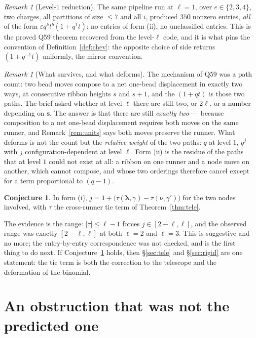 \documentclass[11pt]{article}
\theoremstyle{definition}
\newtheorem{conjecture}[theorem]{Conjecture}
\theoremstyle{remark}
\newtheorem{remark}[theorem]{Remark}
\newcommand{\bl}{\boldsymbol{\lambda}}
\newcommand{\bs}{\mathbf{s}}
\begin{document}
\begin{remark}[Level-$1$ reduction]\label{rem:l1}
The same pipeline run at $\ell=1$, over $e\in\{2,3,4\}$, two charges, all partitions of
size $\le7$ and all $i$, produced $350$ nonzero entries, \emph{all} of the form
$\varepsilon q^{k}t^{b}(1+q^{1}t)$: no entries of form (ii), no unclassified entries.
This is the proved Q59 theorem recovered from the level-$\ell$ code, and it is what
pins the convention of Definition~\ref{def:chev}: the opposite choice of side returns
$(1+q^{-1}t)$ uniformly, the mirror convention.
\end{remark}

\begin{remark}[What survives, and what deforms]
The mechanism of Q59 was a path count: two bead moves compose to a net one-bead
displacement in exactly two ways, at consecutive ribbon heights $s$ and $s+1$, and the
$(1+qt)$ is those two paths. The brief asked whether at level $\ell$ there are still
two, or $2\ell$, or a number depending on $\bs$. The answer is that there are still
\emph{exactly two} --- because composition to a net one-bead displacement requires both
moves on the same runner, and Remark~\ref{rem:units} says both moves preserve the
runner. What deforms is not the count but the \emph{relative weight} of the two paths:
$q$ at level $1$, $q^{j}$ with $j$ configuration-dependent at level $\ell$. Form (ii)
is the residue of the paths that at level $1$ could not exist at all: a ribbon on one
runner and a node move on another, which cannot compose, and whose two orderings
therefore cancel except for a term proportional to $(q-1)$.
\end{remark}

\begin{conjecture}\label{conj:j}
In form (i), $j=1+\big(\tau(\bl,\gamma)-\tau(\nu,\gamma')\big)$ for the two nodes
involved, with $\tau$ the cross-runner tie term of Theorem~\ref{thm:tele}.
\end{conjecture}

The evidence is the range: $|\tau|\le\ell-1$ forces $j\in[2-\ell,\ell]$, and the
observed range was exactly $[2-\ell,\ell]$ at both $\ell=2$ and $\ell=3$. This is
suggestive and no more; the entry-by-entry correspondence was not checked, and is the
first thing to do next. If Conjecture~\ref{conj:j} holds, then \S\ref{sec:tele} and
\S\ref{sec:rigid} are one statement: the tie term is both the correction to the
telescope and the deformation of the binomial.

\section{An obstruction that was not the predicted one}\label{sec:heis}
\end{document}
